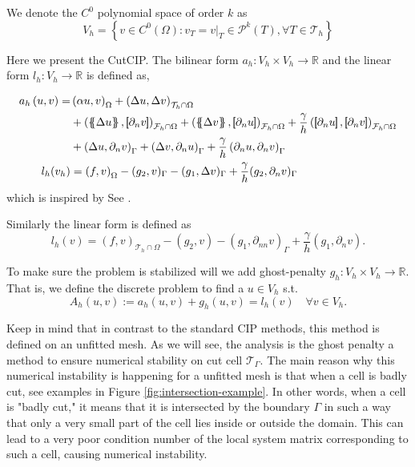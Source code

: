 We denote the $C^{0}$ polynomial space of order $k$ as
\[
V_{h} = \left\{ v \in C^{0}\left( \Omega  \right): v_{T} = v | _{T} \in \mathcal{P} ^{k}\left( T \right), \forall T \in
\mathcal{T}_{h}    \right\}
\]

Here we present the CutCIP. The bilinear form $a_{h}:  V_{h}\times  V_{h} \to \mathbb{R} $ and the linear form $l_{h}: V_{h} \to \mathbb{R} $  is defined as,

\begin{equation*}
\begin{split}
a_{h} \left( u, v \right)   =&
    \left( \alpha  u, v \right) _{\Omega }   +  \left( \Delta  u, \Delta v \right) _{\mathcal{T} _{h} \cap \Omega } \\
 & + \left( \mean{  \Delta  u }, \jump{ \partial _{n }v} \right)_{\mathcal{F}_{h} \cap \Omega  }  + \left( \mean{ \Delta  v }, \jump{ \partial _{n}u }      \right)_{\mathcal{F}_{h} \cap \Omega }  + \frac{\gamma }{h}  \left( \jump{ \partial _{n} u}, \jump{ \partial _{n} v   }   \right)_{\mathcal{F}_{h}\cap \Omega } \\
 & + \left(   \Delta  u ,  \partial _{n }v \right)_{\Gamma   }  + \left(  \Delta  v ,  \partial _{n}u       \right)_{\Gamma  }  + \frac{\gamma }{h}  \left(  \partial _{n} u,  \partial _{n} v      \right)_{ \Gamma } \\
 l_{h}( v_{h}) & =  \left( f, v \right) _{\Omega } - ( g_{2},  v )_{\Gamma } -  ( g_{1}, \Delta  v  )_{\Gamma }  + \frac{\gamma }{h} ( g_{2}, \partial _{n} v  )_{\Gamma }
\end{split}
\end{equation*}
which is inspired by See \cite[Equation 3.4]{feng2007fully}.


Similarly the linear form is defined as
 \[
l_{h}( v) =  ( f,v)_{\mathcal{T} _{h} \cap \Omega } - (g_{2},v) - ( g_{1}, \partial _{nn}v) _{\Gamma } + \frac{\gamma }{h}  ( g_{1}, \partial _{n} v)   .
\]


To make sure the problem is stabilized will we add ghost-penalty $g_{h}: V_{h} \times  V_{h} \to \mathbb{R} $. That is, we define the discrete problem to find a $u \in V_{h}$ s.t. \[
A_{h}( u ,v ) := a_{h}( u, v)  + g_{h}( u,v) = l_{h} ( v) \quad  \forall v \in  V_{h}.
\]

Keep in mind that in contrast to the standard CIP methods, this method is defined on an unfitted mesh. As we will see, the analysis is the ghost penalty a method to ensure numerical stability on cut cell $\mathcal{T} _{\Gamma }$. The main reason why
this numerical instability is happening for a unfitted mesh is that when a cell is badly cut, see examples in Figure \ref{fig:intersection-example}.
In other words, when a cell is "badly cut," it means that it is intersected by the boundary $\Gamma$ in such a way that only a very small part of the cell lies inside or outside the domain. This can lead to a very poor condition number of the local system matrix corresponding to such a cell, causing numerical instability.


